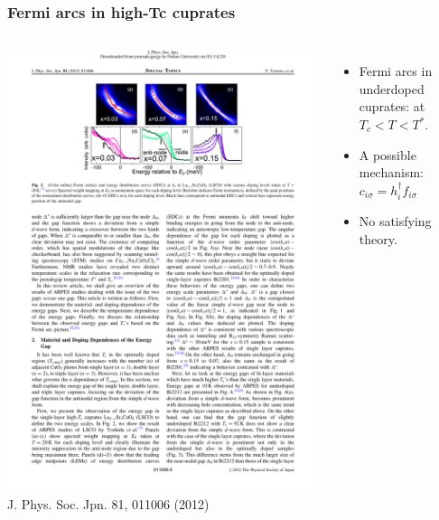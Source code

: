 \documentclass[xcolor=table, 10pt, aspectratio=43]{beamer}
\begin{document}
\begin{frame}
	\frametitle{Fermi arcs in high-Tc cuprates}
	\begin{columns}
		\includegraphics{arc_arpes}
		{\small J. Phys. Soc. Jpn. 81, 011006 (2012)}
		\begin{itemize}
			\item Fermi arcs in underdoped cuprates: at $T_c<T<T^*$.
			\vspace{3em}
			\item A possible mechanism:
			$c_{i\sigma} = h_i^\dagger f_{i\sigma}$
			\vspace{3em}
			\item No satisfying theory.
		\end{itemize}
	\end{columns}
\end{frame}
\end{document}
